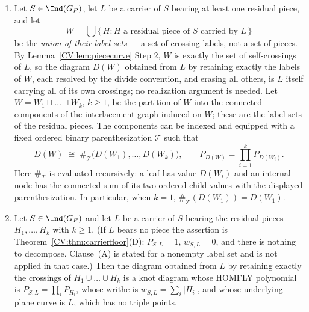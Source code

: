 \begin{corollary}\label{CV:cor:groupedknot}\leanok
\begin{enumerate}
\item[(A)] Let $S\in\Ind(G_P)$, let $L$ be a carrier of $S$ bearing at least one residual
piece, and let
\[
   W=\bigcup\{\,H: H\text{ a residual piece of }S\text{ carried by }L\,\}
\]
be the \emph{union of their label sets} --- a set of crossing labels, not a set
of pieces. By Lemma~\ref{CV:lem:piececurve} Step 2, $W$ is exactly the set of
self-crossings of $L$, so the diagram $D(W)$ obtained from $L$ by retaining
exactly the labels of $W$, each resolved by the divide convention, and erasing
all others, is $L$ itself carrying all of its own crossings; no realization
argument is needed. Let $W=W_1\sqcup\dots\sqcup W_k$, $k\geq1$, be the partition
of $W$ into the connected components of the interlacement graph induced on $W$;
these are the label sets of the residual pieces. The components can be indexed
and equipped with a fixed ordered binary parenthesization $\mathcal T$ such that
\[
D(W)\;\cong\;\#_{\mathcal T}
   \bigl(D(W_1),\dots,D(W_k)\bigr),
\qquad
P_{D(W)}=\prod_{i=1}^{k}P_{D(W_i)} .
\]
Here $\#_{\mathcal T}$ is evaluated recursively: a leaf has value $D(W_i)$
and an internal node has the connected sum of its two ordered child values
with the displayed parenthesization. In particular, when $k=1$,
$\#_{\mathcal T}(D(W_1))=D(W_1)$.
\item[(B)] Let $S\in\Ind(G_P)$ and let $L$ be a carrier of $S$ bearing the residual pieces
$H_1,\dots,H_k$ with $k\geq1$. (If $L$ bears no piece the assertion is
Theorem~\ref{CV:thm:carrierfloor}(D): $P_{S,L}=1$, $w_{S,L}=0$, and there is nothing to
decompose. Clause~(A) is stated for a nonempty label set and
is not applied in that case.) Then the diagram obtained from $L$ by retaining exactly the
crossings of $H_1\cup\dots\cup H_k$ is a knot diagram whose HOMFLY polynomial is
$P_{S,L}=\prod_iP_{H_i}$, whose writhe is $w_{S,L}=\sum_i|H_i|$, and whose
underlying plane curve is $L$, which has no triple points.
\end{enumerate}
\end{corollary}
